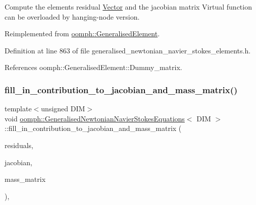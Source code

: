 Compute the element\textquotesingle{}s residual \hyperlink{classoomph_1_1Vector}{Vector} and the jacobian matrix Virtual function can be overloaded by hanging-\/node version. 



Reimplemented from \hyperlink{classoomph_1_1GeneralisedElement_a6ae09fc0d68e4309ac1b03583d252845}{oomph\+::\+Generalised\+Element}.



Definition at line 863 of file generalised\+\_\+newtonian\+\_\+navier\+\_\+stokes\+\_\+elements.\+h.



References oomph\+::\+Generalised\+Element\+::\+Dummy\+\_\+matrix.

\mbox{\label{classoomph_1_1GeneralisedNewtonianNavierStokesEquations_a0fcfa12094978020507c8d4aa2a9669f}} 
\subsubsection{\texorpdfstring{fill\+\_\+in\+\_\+contribution\+\_\+to\+\_\+jacobian\+\_\+and\+\_\+mass\+\_\+matrix()}{fill\_in\_contribution\_to\_jacobian\_and\_mass\_matrix()}}
{\footnotesize\ttfamily template$<$unsigned D\+IM$>$ \\
void \hyperlink{classoomph_1_1GeneralisedNewtonianNavierStokesEquations}{oomph\+::\+Generalised\+Newtonian\+Navier\+Stokes\+Equations}$<$ D\+IM $>$\+::fill\+\_\+in\+\_\+contribution\+\_\+to\+\_\+jacobian\+\_\+and\+\_\+mass\+\_\+matrix (\begin{DoxyParamCaption}\item[{\hyperlink{classoomph_1_1Vector}{Vector}$<$ double $>$ \&}]{residuals,  }\item[{\hyperlink{classoomph_1_1DenseMatrix}{Dense\+Matrix}$<$ double $>$ \&}]{jacobian,  }\item[{\hyperlink{classoomph_1_1DenseMatrix}{Dense\+Matrix}$<$ double $>$ \&}]{mass\+\_\+matrix }\end{DoxyParamCaption})\hspace{0.3cm}{\ttfamily [inline]}, {\ttfamily [virtual]}}



